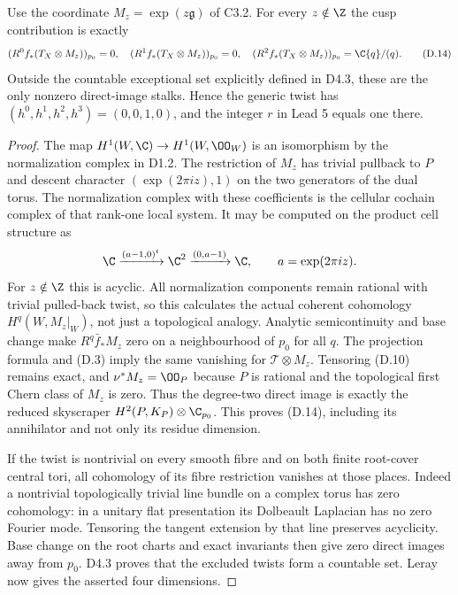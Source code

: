 \begin{proposition}\label{inv:D4.2}
Use the coordinate $M_z=\exp(z\mathfrak g)$ of C3.2. For every
$z\notin\Z$ the cusp contribution is exactly
\[
 (R^0f_*(T_X\otimes M_z))_{p_0}=0,\quad
 (R^1f_*(T_X\otimes M_z))_{p_0}=0,\quad
 (R^2f_*(T_X\otimes M_z))_{p_0}=\C\{q\}/(q).           \tag{D.14}
\]
Outside the countable exceptional set explicitly defined in D4.3,
these are the only nonzero direct-image stalks. Hence the generic
twist has $(h^0,h^1,h^2,h^3)=(0,0,1,0)$, and the integer $r$ in
Lead 5 equals one there.
\end{proposition}
\begin{proof}
The map $H^1(W,\C)\to H^1(W,\OO_W)$ is an isomorphism by the
normalization complex in D1.2. The restriction of $M_z$ has trivial
pullback to $P$ and descent character
$(\exp(2\pi iz),1)$ on the two generators of the dual torus. The
normalization complex with these coefficients is the cellular
cochain complex of that rank-one local system. It may be computed
on the product cell structure as
\[
 \C\xrightarrow{(a-1,0)^t}\C^2
 \xrightarrow{(0,a-1)}\C,
 \qquad a=\exp(2\pi iz).
\]
For $z\notin\Z$ this is acyclic. All normalization components remain
rational with trivial pulled-back twist, so this calculates the
actual coherent cohomology $H^q(W,M_z|_W)$, not just a topological
analogy. Analytic semicontinuity and base change make
$R^q\bar f_*M_z$ zero on a neighbourhood of $p_0$ for all $q$.
The projection formula and (D.3) imply the same vanishing for
$\mathcal T\otimes M_z$. Tensoring (D.10) remains exact, and
$\nu^*M_z=\OO_P$ because $P$ is rational and the topological first
Chern class of $M_z$ is zero. Thus the degree-two direct image is
exactly the reduced skyscraper $H^2(P,K_P)\otimes\C_{p_0}$.
This proves (D.14), including its annihilator and not only its residue
dimension.

If the twist is nontrivial on every smooth fibre and on both finite
root-cover central tori, all cohomology of its fibre restriction
vanishes at those places. Indeed a nontrivial topologically trivial
line bundle on a complex torus has zero cohomology: in a unitary flat
presentation its Dolbeault Laplacian has no zero Fourier mode.
Tensoring the tangent extension by that line preserves acyclicity.
Base change on the root charts and exact invariants then give zero
direct images away from $p_0$. D4.3 proves that the excluded twists
form a countable set. Leray now gives the asserted four dimensions.
\end{proof}

